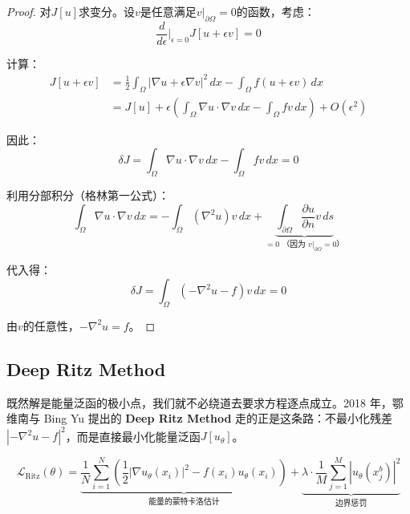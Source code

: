 \begin{proof}
对$J[u]$求变分。设$v$是任意满足$v|_{\partial\Omega} = 0$的函数，考虑：
\begin{equation}
    \frac{d}{d\epsilon}\bigg|_{\epsilon=0} J[u + \epsilon v] = 0
\end{equation}

计算：
\begin{align}
    J[u + \epsilon v] &= \frac{1}{2}\int_\Omega |\nabla u + \epsilon \nabla v|^2 \, dx - \int_\Omega f(u + \epsilon v) \, dx \\
    &= J[u] + \epsilon \left( \int_\Omega \nabla u \cdot \nabla v \, dx - \int_\Omega fv \, dx \right) + O(\epsilon^2)
\end{align}

因此：
\begin{equation}
    \delta J = \int_\Omega \nabla u \cdot \nabla v \, dx - \int_\Omega fv \, dx = 0
\end{equation}

利用分部积分（格林第一公式）：
\begin{equation}
    \int_\Omega \nabla u \cdot \nabla v \, dx = -\int_\Omega (\nabla^2 u) v \, dx + \underbrace{\int_{\partial\Omega} \frac{\partial u}{\partial n} v \, ds}_{= 0 \text{ （因为 } v|_{\partial\Omega} = 0\text{）}}
\end{equation}

代入得：
\begin{equation}
    \delta J = \int_\Omega (-\nabla^2 u - f) v \, dx = 0
\end{equation}

由$v$的任意性，$-\nabla^2 u = f$。
\end{proof}

\subsection{Deep Ritz Method}

既然解是能量泛函的极小点，我们就不必绕道去要求方程逐点成立。2018 年，鄂维南与 Bing Yu 提出的 \textbf{Deep Ritz Method} 走的正是这条路：不最小化残差$|{-\nabla^2 u - f}|^2$，而是直接最小化能量泛函$J[u_\theta]$。

\begin{equation}
    \mathcal{L}_{\text{Ritz}}(\theta) = \underbrace{\frac{1}{N}\sum_{i=1}^{N} \left( \frac{1}{2}|\nabla u_\theta(x_i)|^2 - f(x_i) u_\theta(x_i) \right)}_{\text{能量的蒙特卡洛估计}} + \underbrace{\lambda \cdot \frac{1}{M}\sum_{j=1}^{M} |u_\theta(x_j^b)|^2}_{\text{边界惩罚}}
\end{equation}

